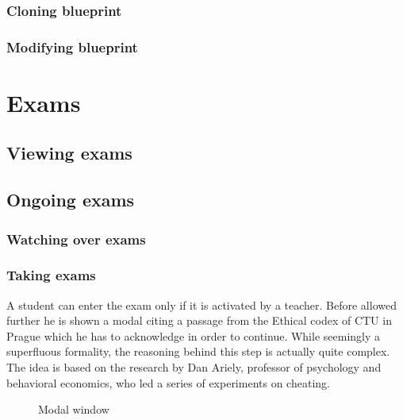 \documentclass[thesis=M,english,hidelinks]{FITthesis}[2012/10/20]
\begin{document}
    \subsubsection{Cloning blueprint}

    \subsubsection{Modifying blueprint}

  \section{Exams}

    \subsection{Viewing exams}

    \subsection{Ongoing exams}

      \subsubsection{Watching over exams}

      \subsubsection{Taking exams}

A student can enter the exam only if it is activated by a teacher. Before allowed further he is shown a modal citing a passage from the Ethical codex of CTU in Prague which he has to acknowledge in order to continue. While seemingly a superfluous formality, the reasoning behind this step is actually quite complex. The idea is based on the research by Dan Ariely, professor of psychology and behavioral economics, who led a series of experiments on cheating.

\begin{figure}[h]
  \setlength\fboxsep{0pt}
  \setlength\fboxrule{0.2pt}
  \caption{Modal window}
  \label{fig:ethical-codex}
\end{figure}
\end{document}
